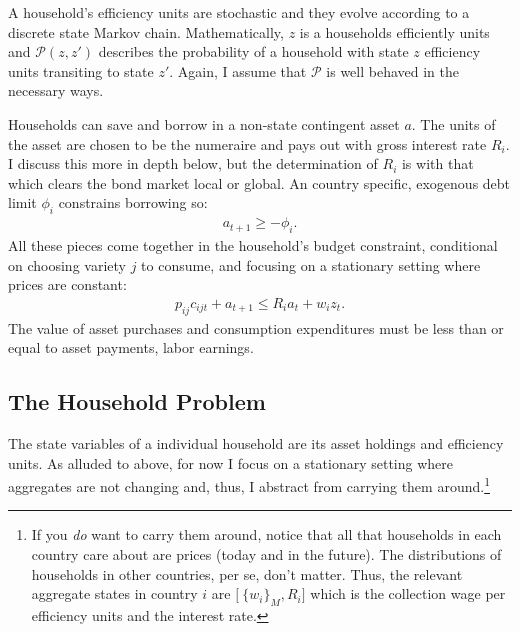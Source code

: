 \documentclass[12pt,pdftex]{article}
\begin{document}
\begin{onehalfspacing}
A household's efficiency units are stochastic and they evolve according to a discrete state Markov chain. Mathematically, $z$ is a households efficiently units and $\mathcal{P}(z,z')$ describes the probability of a household with state $z$ efficiency units transiting to state $z'$. Again, I assume that $\mathcal{P}$ is well behaved in the necessary ways. 

Households can save and borrow in a non-state contingent asset $a$. The units of the asset are chosen to be the numeraire and pays out with gross interest rate $R_i$. I discuss this more in depth below, but the determination of $R_{i}$ is with that which clears the bond market local or global. An country specific, exogenous debt limit $\phi_{i}$ constrains borrowing so:
\begin{align}
a_{t+1} \geq - \phi_{i}.
\label{eq:borrowing-constraint}
\end{align}
All these pieces come together in the household's budget constraint, conditional on choosing variety $j$ to consume, and focusing on a stationary setting where prices are constant:
\begin{align}
p_{ij}c_{ijt} +  a_{t+1} \leq    R_{i} a_{t} + w_{i} z_{t}.\label{eq:trade-budget-constraint}
\end{align}
The value of asset purchases and consumption expenditures must be less than or equal to asset payments, labor earnings.

\subsection{The Household Problem}

The state variables of a individual household are its asset holdings and efficiency units. As alluded to above, for now I focus on a stationary setting where aggregates are not changing and, thus, I abstract from carrying them around.\footnote{If you \emph{do} want to carry them around, notice that all that households in each country care about are prices (today and in the future). The distributions of households in other countries, per se, don't matter. Thus, the relevant aggregate states in country $i$ are $\big [ \ \{ w_i \}_{M}, R_i \big ]$ which is the collection wage per efficiency units and the interest rate.}


\end{onehalfspacing}
\end{document}
